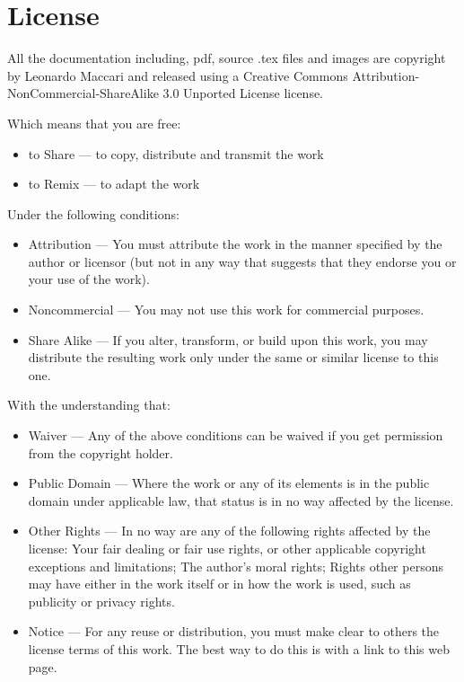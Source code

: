 
\newpage
\section{License}
All the documentation including, pdf, source .tex files and images are
copyright by Leonardo Maccari and released using a Creative Commons
Attribution-NonCommercial-ShareAlike 3.0 Unported License license.

Which means that you are free:

\begin{itemize}
\item to Share — to copy, distribute and transmit the work
\item to Remix — to adapt the work
\end{itemize}

Under the following conditions:

\begin{itemize}
 \item   Attribution — You must attribute the work in the manner specified by the author or licensor (but not in any way that suggests that they endorse you or your use of the work).

 \item   Noncommercial — You may not use this work for commercial purposes.

 \item   Share Alike — If you alter, transform, or build upon this work, you may distribute the resulting work only under the same or similar license to this one.
\end{itemize}

With the understanding that:

\begin{itemize}
 \item   Waiver — Any of the above conditions can be waived if you get permission from the copyright holder.
 \item   Public Domain — Where the work or any of its elements is in the public domain under applicable law, that status is in no way affected by the license.
 \item   Other Rights — In no way are any of the following rights affected by the license:
        Your fair dealing or fair use rights, or other applicable copyright exceptions and limitations;
        The author's moral rights;
        Rights other persons may have either in the work itself or in how the work is used, such as publicity or privacy rights.
 \item   Notice — For any reuse or distribution, you must make clear to others the license terms of this work. The best way to do this is with a link to this web page.

\end{itemize}
